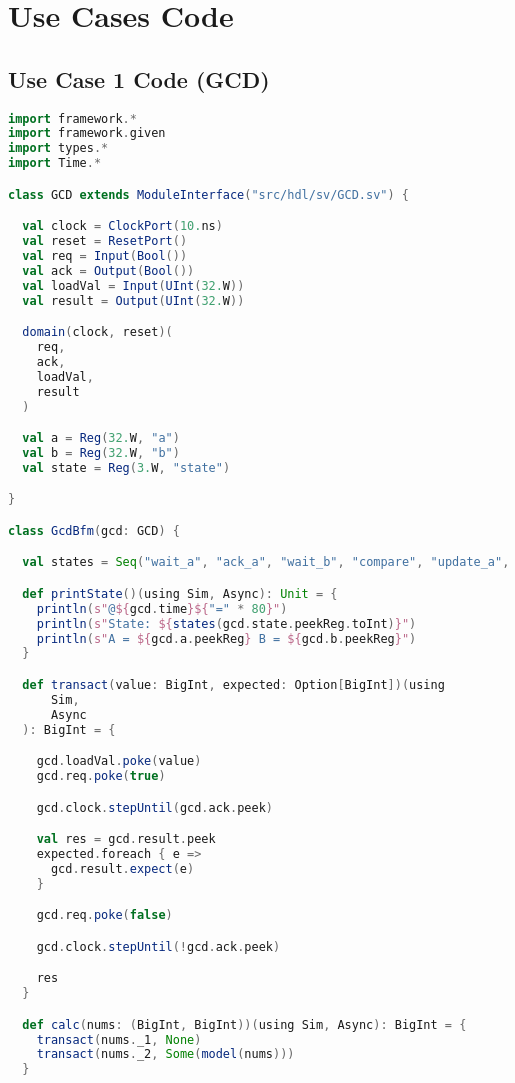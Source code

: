 \chapter{Use Cases Code} %
\section{Use Case 1 Code (GCD)} %
\label{sec:gcd_test}
\begin{lstlisting}[language=scala, captionpos=b, caption=Test code for the GCD circuit.,label=lst:gcd_test]
import framework.*
import framework.given
import types.*
import Time.*

class GCD extends ModuleInterface("src/hdl/sv/GCD.sv") {

  val clock = ClockPort(10.ns)
  val reset = ResetPort()
  val req = Input(Bool())
  val ack = Output(Bool())
  val loadVal = Input(UInt(32.W))
  val result = Output(UInt(32.W))

  domain(clock, reset)(
    req,
    ack,
    loadVal,
    result
  )

  val a = Reg(32.W, "a")
  val b = Reg(32.W, "b")
  val state = Reg(3.W, "state")

}

class GcdBfm(gcd: GCD) {

  val states = Seq("wait_a", "ack_a", "wait_b", "compare", "update_a", "update_b", "ack_result")

  def printState()(using Sim, Async): Unit = {
    println(s"@${gcd.time}${"=" * 80}")
    println(s"State: ${states(gcd.state.peekReg.toInt)}")
    println(s"A = ${gcd.a.peekReg} B = ${gcd.b.peekReg}")
  }

  def transact(value: BigInt, expected: Option[BigInt])(using
      Sim,
      Async
  ): BigInt = {

    gcd.loadVal.poke(value)
    gcd.req.poke(true)

    gcd.clock.stepUntil(gcd.ack.peek)

    val res = gcd.result.peek
    expected.foreach { e =>
      gcd.result.expect(e)
    }

    gcd.req.poke(false)

    gcd.clock.stepUntil(!gcd.ack.peek)

    res
  }

  def calc(nums: (BigInt, BigInt))(using Sim, Async): BigInt = {
    transact(nums._1, None)
    transact(nums._2, Some(model(nums)))
  }


\end{lstlisting}
